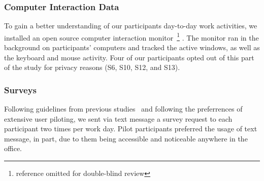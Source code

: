 \subsubsection{Computer Interaction Data}
To gain a better understanding of our participants day-to-day work activities, we installed an open source computer interaction monitor~\footnote{reference omitted for double-blind review} . The monitor ran in the background on participants' computers and tracked the active windows, as well as the keyboard and mouse activity. Four of our participants opted out of this part of the study for privacy reasons (S6, S10, S12, and S13). %

\subsubsection{Surveys}
\label{sec:Surveys}
Following guidelines from previous studies~\cite{Lalle16,Panwar18,Luo18} and 
following the preferrences of extensive user piloting, we sent via 
text message a survey request to each participant two times per 
work day. Pilot participants preferred the usage of text message, in part, due 
to them being accessible and noticeable anywhere in the office. 

